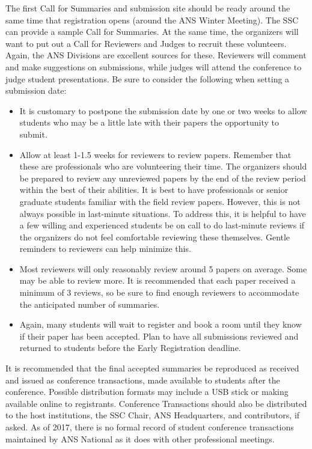 \documentclass[12pt]{article}
\begin{document}
The first Call for Summaries and submission site should be ready around the same time that registration opens (around the ANS Winter Meeting).
The SSC can provide a sample Call for Summaries.
At the same time, the organizers will want to put out a Call for Reviewers and Judges to recruit these volunteers.
Again, the ANS Divisions are excellent sources for these.
Reviewers will comment and make suggestions on submissions, while judges will attend the conference to judge student presentations.
Be sure to consider the following when setting a submission date:
\begin{itemize}
	\item It is customary to postpone the submission date by one or two weeks to allow students who may be a little late with their papers the opportunity to submit.
    \item Allow at least 1-1.5 weeks for reviewers to review papers. Remember that these are professionals who are volunteering their time. The organizers should be prepared to review any unreviewed papers by the end of the review period within the best of their abilities. It is best to have professionals or senior graduate students familiar with the field review papers. However, this is not always possible in last-minute situations. To address this, it is helpful to have a few willing and experienced students be on call to do last-minute reviews if the organizers do not feel comfortable reviewing these themselves. Gentle reminders to reviewers can help minimize this.
    \item Most reviewers will only reasonably review around 5 papers on average. Some may be able to review more. It is recommended that each paper received a minimum of 3 reviews, so be sure to find enough reviewers to accommodate the anticipated number of summaries.
    \item Again, many students will wait to register and book a room until they know if their paper has been accepted. Plan to have all submissions reviewed and returned to students before the Early Registration deadline.
\end{itemize}

It is recommended that the final accepted summaries be reproduced as received and issued as conference transactions, made available to students after the conference.
Possible distribution formats may include a USB stick or making available online to registrants.
Conference Transactions should also be distributed to the host institutions, the SSC Chair, ANS Headquarters, and contributors, if asked.
As of 2017, there is no formal record of student conference transactions maintained by ANS National as it does with other professional meetings.
\end{document}
